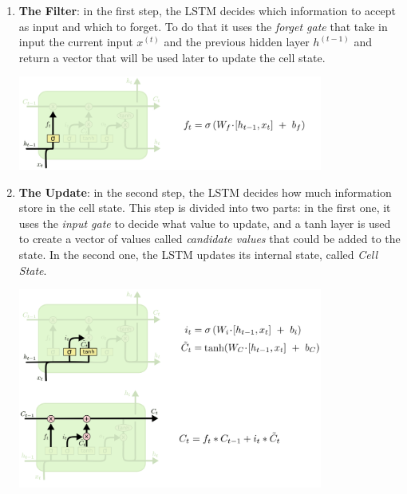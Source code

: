 \begin{enumerate}
\item \textbf{The Filter}: in the first step, the LSTM decides which information to accept as input and which to forget. To do that it uses the \textit{forget gate} that take in input the current input $x^{(t)}$ and the previous hidden layer $h^{(t-1)}$  and return a vector that will be used later to update the cell state. \\
\begin{minipage}{\linewidth}
            \centering
            \includegraphics[width=10cm]{pictures/lstm_step1png}
        \end{minipage}
		

\item \textbf{The Update}: in the second step, the LSTM decides how much information store in the cell state. This step is divided into two parts: in the first one, it uses the \textit{input gate} to decide what value to update, and a tanh layer is used to create a vector of values called \textit{candidate values} that could be added to the state. In the second one, the LSTM updates its internal state, called \textit{Cell State}. 
			\begin{minipage}{\linewidth}
            \centering
            \includegraphics[width=10cm]{pictures/lstm_step2-3}
        \end{minipage}


\end{enumerate}
